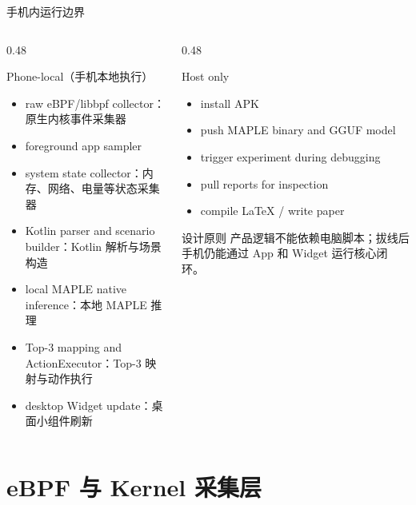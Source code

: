 \documentclass[UTF8,aspectratio=169,10pt]{ctexbeamer}
\begin{document}
\begin{frame}{手机内运行边界}
  \begin{columns}[T,totalwidth=\textwidth]
    \begin{column}{0.48\textwidth}
      \begin{block}{Phone-local（手机本地执行）}
        \begin{itemize}
          \item raw eBPF/libbpf collector：原生内核事件采集器
          \item foreground app sampler
          \item system state collector：内存、网络、电量等状态采集器
          \item Kotlin parser and scenario builder：Kotlin 解析与场景构造
          \item local MAPLE native inference：本地 MAPLE 推理
          \item Top-3 mapping and ActionExecutor：Top-3 映射与动作执行
          \item desktop Widget update：桌面小组件刷新
        \end{itemize}
      \end{block}
    \end{column}
    \begin{column}{0.48\textwidth}
      \begin{block}{Host only}
        \begin{itemize}
          \item install APK
          \item push MAPLE binary and GGUF model
          \item trigger experiment during debugging
          \item pull reports for inspection
          \item compile LaTeX / write paper
        \end{itemize}
      \end{block}
      \begin{alertblock}{设计原则}
        产品逻辑不能依赖电脑脚本；拔线后手机仍能通过 App 和 Widget 运行核心闭环。
      \end{alertblock}
    \end{column}
  \end{columns}
\end{frame}

\section{eBPF 与 Kernel 采集层}
\end{document}
